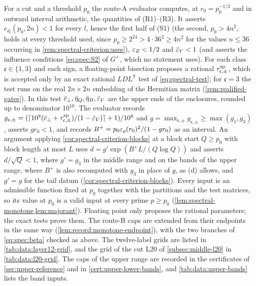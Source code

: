 \begin{remark}\label{rem:spectral-criterion:certificate}
For a cut and a threshold $p_0$ the route-A evaluator computes, at $r_0=p_0^{-1/2}$ and in
outward interval arithmetic, the quantities of (R1)--(R3). It asserts
$e_{d_l}(p_0,2n)<1$ for every $l$, hence the first half of (S1) (the second, $p_0>4n^2$,
holds at every threshold used, since $p_0\ge2^{24}>4\cdot36^2\ge4n^2$ for the values $n\le36$ occurring in \cref{rem:spectral-criterion:uses}), $\varepsilon_Z<1/2$
and $\bar{\varepsilon}_V<1$ (and asserts the influence conditions \eqref{eq:spec:S2} of $G^+$,
which no statement uses). For each class $\mathfrak c\in\{1,3\}$ and each sign, a
floating-point bisection proposes a rational $\tau^{\rm sp}_{\mathfrak c,\pm}$, which is accepted
only by an exact rational $LDL^{\mathsf T}$ test of \eqref{eq:spectral-test}; for $\mathfrak c=3$ the
test runs on the real $2n\times2n$ embedding of the Hermitian matrix
(\cref{rem:realified-gates}). In this test
$\bar c_{\perp},\bar\eta_Q,\bar\eta_B,\bar{\varepsilon}_V$ are the upper ends of the enclosures, rounded up
to denominator $10^{10}$. The evaluator records
$g_{\mathfrak c,\pm}=(\lceil10^8(\bar c_{\perp}+\tau^{\rm sp}_{\mathfrak c,\pm})/(1-\bar{\varepsilon}_V)\rceil+1)/10^8$ and
$g=\max_{\mathfrak c,\pm}g_{\mathfrak c,\pm}\ge\max(g_1,g_3)$, asserts $gr_0<1$, and records
$B^+=p_0\varepsilon_\varrho(r_0)^2/(1-gr_0)$ as an interval. An argument applying \cref{cor:spectral-criterion-blocks} at a block start $Q\ge p_0$
with block length at most $L$ uses $d=g'\exp(B^+L/(Q\log Q))$ and asserts $d/\sqrt Q<1$,
where $g'=g_3$ in the middle range and on the bands of the upper range, where $B^+$ is also recomputed with $g_3$ in place of $g$, as (d) allows, and $g'=g$
for the tail datum (\cref{cor:spectral-criterion-blocks}). Every input is an admissible function fixed at
$p_0$ together with the partitions and the test matrices, so its value at $p_0$ is a
valid input at every prime $p\ge p_0$ (\cref{lem:spectral-monotone,lem:majorant}). Floating
point only proposes the rational parameters; the exact tests prove them. The route-B
caps are extended from their endpoints in the same way
(\cref{lem:record:monotone-endpoint}), with the two branches of \eqref{eq:spec:beta}
checked as above. The twelve-label grids are listed in \cref{tab:data:layer12-grid},
and the grid of the cut L20 of \cref{subsec:middle-l20} in \cref{tab:data:l20-grid}. The
caps of the upper range are recorded in the certificates of \cref{sec:upper-reference}
and in \cref{cert:upper-lower-bands}, and \cref{tab:data:upper-bands} lists the
band inputs.
\end{remark}

